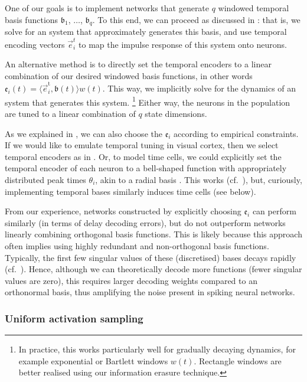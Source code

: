 One of our goals is to implement networks that generate $q$ windowed temporal basis functions $\mathfrak{b}_1$, $\ldots$, $\mathfrak{b}_q$.
To this end, we can proceed as discussed in : that is, we solve for an \LTI system that approximately generates this basis, and use temporal encoding vectors $\vec{e}^t_i$ to map the impulse response of this system onto neurons.

An alternative method is to directly set the temporal encoders to a linear combination of our desired windowed basis functions, in other words $\mathfrak{e}_i(t) = \langle \vec{e}^\mathrm{t}_i, \mathfrak{b}(t) \rangle  w(t)$.
This way, we implicitly solve for the dynamics of an \LTI system that generates this system.%
\footnote{In practice, this works particularly well for gradually decaying dynamics, for example exponential or Bartlett windows $w(t)$. Rectangle windows are better realised using our information erasure technique.}
Either way, the neurons in the population are tuned to a linear combination of $q$ state dimensions.

As we explained in , we can also choose the $\mathfrak{e}_i$ according to empirical constraints.
If we would like to emulate temporal tuning in visual cortex, then we select temporal encoders as in .
Or, to model time cells, we could explicitly set the temporal encoder of each neuron to a bell-shaped function with appropriately distributed peak times $\theta_i$, akin to a radial basis \citep{broomhead1988radial,stockel2020assorted}.
This works (cf.~), but, curiously, implementing temporal bases similarly induces time cells (see below).

From our experience, networks constructed by explicitly choosing $\mathfrak{e}_i$ can perform similarly (in terms of delay decoding errors), but do not outperform networks linearly combining orthogonal basis functions.
This is likely because this approach often implies using highly redundant and non-orthogonal basis functions.
Typically, the first few singular values of these (discretised) bases decays rapidly (cf.~).
Hence, although we can theoretically decode more functions (fewer singular values are zero), this requires larger decoding weights compared to an orthonormal basis, thus amplifying the noise present in spiking neural networks.


\subsubsection{Uniform activation sampling}

